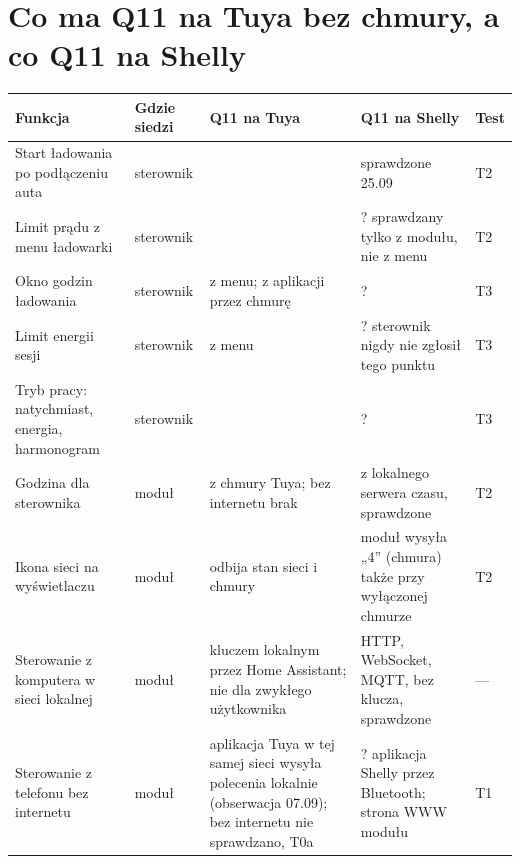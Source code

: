 \documentclass[11pt,a4paper]{article}
\begin{document}
\section{Co ma Q11 na Tuya bez chmury, a co Q11 na Shelly}

\begin{longtable}{>{\raggedright\arraybackslash}p{3.95cm}>{\raggedright\arraybackslash}p{1.82cm}>{\raggedright\arraybackslash}p{4.15cm}>{\raggedright\arraybackslash}p{3.53cm}>{\raggedright\arraybackslash}p{0.95cm}}
\toprule
\rowcolor{apteallight}\textbf{Funkcja} & \textbf{Gdzie siedzi} & \textbf{Q11 na Tuya} & \textbf{Q11 na Shelly} & \textbf{Test} \\
\midrule\endhead
\bottomrule\endfoot
Start ładowania po podłączeniu auta & sterownik & \leavevmode{\symbolfont\color{apgreen}\textbf{✔}} & \leavevmode{\symbolfont\color{apgreen}\textbf{✔}} sprawdzone 25.09 & T2 \\
Limit prądu z menu ładowarki & sterownik & \leavevmode{\symbolfont\color{apgreen}\textbf{✔}} & ? sprawdzany tylko z modułu, nie z menu & T2 \\
Okno godzin ładowania & sterownik & \leavevmode{\symbolfont\color{apgreen}\textbf{✔}} z menu; z aplikacji przez chmurę & ? & T3 \\
Limit energii sesji & sterownik & \leavevmode{\symbolfont\color{apgreen}\textbf{✔}} z menu & ? sterownik nigdy nie zgłosił tego punktu & T3 \\
Tryb pracy: natychmiast, energia, harmonogram & sterownik & \leavevmode{\symbolfont\color{apgreen}\textbf{✔}} & ? & T3 \\
Godzina dla sterownika & moduł & z chmury Tuya; bez internetu brak & \leavevmode{\symbolfont\color{apgreen}\textbf{✔}} z lokalnego serwera czasu, sprawdzone & T2 \\
Ikona sieci na wyświetlaczu & moduł & odbija stan sieci i chmury & \leavevmode{\symbolfont\color{apamber}\textbf{◐}} moduł wysyła „4” (chmura) także przy wyłączonej chmurze & T2 \\
Sterowanie z komputera w sieci lokalnej & moduł & \leavevmode{\symbolfont\color{apamber}\textbf{◐}} kluczem lokalnym przez Home Assistant; nie dla zwykłego użytkownika & \leavevmode{\symbolfont\color{apgreen}\textbf{✔}} HTTP, WebSocket, MQTT, bez klucza, sprawdzone & — \\
Sterowanie z telefonu bez internetu & moduł & \leavevmode{\symbolfont\color{apamber}\textbf{◐}} aplikacja Tuya w tej samej sieci wysyła polecenia lokalnie (obserwacja 07.09); bez internetu nie sprawdzano, T0a & ? aplikacja Shelly przez Bluetooth; strona WWW modułu & T1 \\

\end{longtable}
\end{document}
